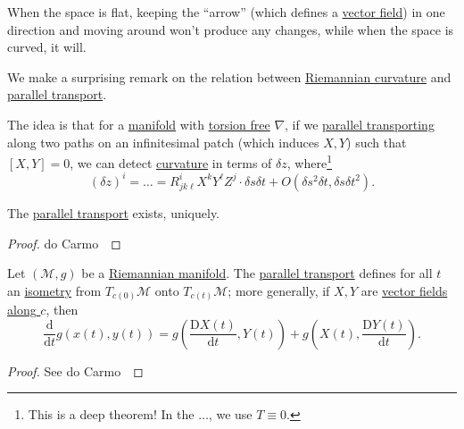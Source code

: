 \begin{intuition}
	When the space is flat, keeping the ``arrow'' (which defines a \hyperref[def:vector-field]{vector field}) in one direction and moving around won't produce any changes, while when the space is curved, it will.
	\begin{center}
	\end{center}
\end{intuition}

We make a surprising remark on the relation between \hyperref[def:Riemannian-curvature]{Riemannian curvature} and \hyperref[def:parallel-transport]{parallel transport}.

\begin{remark}
	The idea is that for a \hyperref[def:smooth-manifold]{manifold} with \hyperref[def:torsion-free]{torsion free} \(\nabla \), if we \hyperref[def:parallel-transport]{parallel transporting} along two paths on an infinitesimal patch (which induces \(X, Y\)) such that \([X, Y]=0\), we can detect \hyperref[def:Riemannian-curvature]{curvature} in terms of \(\delta z\), where\footnote{This is a deep theorem! In the \(\ldots \), we use \(T \equiv 0\).}
	\[
		(\delta z)^i = \ldots = R^i_{jk \ell } X^k Y^{\ell} Z^j\cdot \delta s \delta t + O(\delta s^2 \delta t, \delta s \delta t^2).
	\]
	\begin{center}
	\end{center}
\end{remark}

\begin{proposition}
	The \hyperref[def:parallel-transport]{parallel transport} exists, uniquely.
\end{proposition}
\begin{proof}
	do Carmo~\cite[Proposition 2.6]{flaherty2013riemannian}
\end{proof}

\begin{proposition}
	Let \((\mathcal{M} , g)\) be a \hyperref[def:Riemannian-manifold]{Riemannian manifold}. The \hyperref[def:parallel-transport]{parallel transport} defines for all \(t\) an \hyperref[def:isometry]{isometry} from \(T_{c(0)} \mathcal{M} \) onto \(T_{c(t)} \mathcal{M} \); more generally, if \(X, Y\) are \hyperref[def:vector-field-along-curve]{vector fields along \(c\)}, then
	\[
		\frac{\mathrm{d}}{\mathrm{d}t} g(x(t), y(t))
		= g\left( \frac{\mathrm{D} X(t)}{\mathrm{d} t}, Y(t)\right) + g\left(X(t), \frac{\mathrm{D} Y(t)}{\mathrm{d} t} \right) .
	\]
\end{proposition}
\begin{proof}
	See do Carmo~\cite[Proposition 3.2]{flaherty2013riemannian}
\end{proof}

